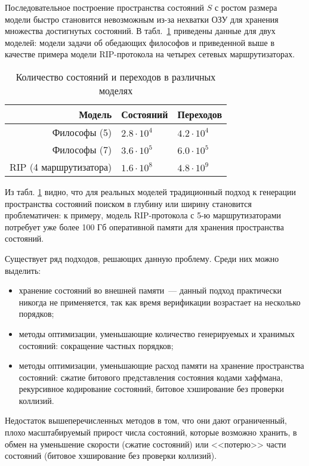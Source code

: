 \documentclass[a4paper,notitlepage,14pt]{article}
\begin{document}
Последовательное построение пространства состояний $S$ с ростом размера модели быстро
становится невозможным из-за нехватки ОЗУ для хранения множества достигнутых состояний. В
табл.~\ref{tab:models-statecount} приведены данные для двух моделей: модели задачи об
обедающих философов и приведенной выше в качестве примера модели RIP-протокола на четырех
сетевых маршрутизаторах.

\begin{table}
  \centering
  \begin{tabular}{|r|l|l|}
    \hline
    Модель                  & Состояний         & Переходов       \\
    \hline
    Философы (5)            & $2.8 \cdot 10^4$  & $4.2 \cdot 10^4$ \\
    Философы (7)            & $3.6 \cdot 10^5$  & $6.0 \cdot 10^5$ \\
    RIP (4 маршрутизатора)  & $1.6 \cdot 10^8$  & $4.8 \cdot 10^9$ \\
    \hline
  \end{tabular}
  \caption{Количество состояний и переходов в различных моделях}
\label{tab:models-statecount}
\end{table}

Из табл. \ref{tab:models-statecount} видно, что для реальных моделей традиционный подход к
генерации пространства состояний поиском в глубину или ширину становится проблематичен: к
примеру, модель RIP-протокола с 5-ю маршрутизаторами потребует уже более 100 Гб
оперативной памяти для хранения пространства состояний.

Существует ряд подходов, решающих данную проблему. Среди них можно выделить:

\begin{itemize}
\item хранение состояний во внешней памяти~--- данный подход практически никогда не
  применяется, так как время верификации возрастает на несколько порядков;
\item методы оптимизации, уменьшающие количество генерируемых и хранимых состояний:
  сокращение частных порядков;
\item методы оптимизации, уменьшающие расход памяти на хранение пространства состояний:
  сжатие битового представления состояния кодами хаффмана, рекурсивное кодирование
  состояний, битовое хэширование без проверки коллизий. 
\end{itemize}

Недостаток вышеперечисленных методов в том, что они дают ограниченный, плохо
масштабируемый прирост числа состояний, которые возможно хранить, в обмен на уменьшение
скорости (сжатие состояний) или <<потерю>> части состояний (битовое хэширование без
проверки коллизий).
\end{document}
